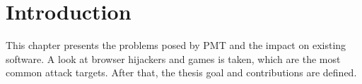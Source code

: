 \section{Introduction}
\label{sec:introduction}
This chapter presents the problems posed by \gls{PMT} and the impact on existing software. A look at browser hijackers and games is taken, which are the most common attack targets. After that, the thesis goal and contributions are defined.



\medskip




